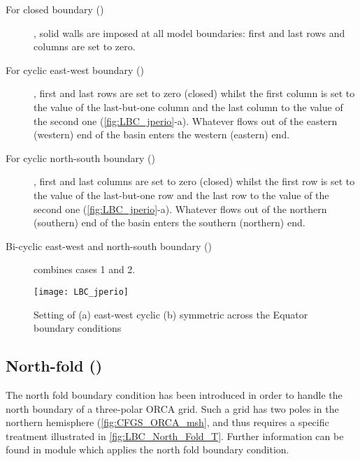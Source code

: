 \documentclass[../main/NEMO_manual]{subfiles}
\begin{document}
\begin{description}

\item [For closed boundary ()], solid walls are imposed at all model boundaries:
  first and last rows and columns are set to zero.

\item [For cyclic east-west boundary ()], first and last rows are set to zero (closed) whilst the first column is set to
  the value of the last-but-one column and the last column to the value of the second one
  (\autoref{fig:LBC_jperio}-a).
  Whatever flows out of the eastern (western) end of the basin enters the western (eastern) end.

\item [For cyclic north-south boundary ()], first and last columns are set to zero (closed) whilst the first row is set to
  the value of the last-but-one row and the last row to the value of the second one
  (\autoref{fig:LBC_jperio}-a).
  Whatever flows out of the northern (southern) end of the basin enters the southern (northern) end.

\item [Bi-cyclic east-west and north-south boundary ()] combines cases 1 and 2.

\end{description}

\begin{figure}[!t]
  \centering
  \texttt{[image: LBC\_jperio]}
  \caption[Setting of east-west cyclic and symmetric across the Equator boundary conditions]{
    Setting of (a) east-west cyclic (b) symmetric across the Equator boundary conditions}
  \label{fig:LBC_jperio}
\end{figure}

\subsection[North-fold (\forcode{=3,6})]{North-fold (\protect{})}
\label{subsec:LBC_north_fold}

The north fold boundary condition has been introduced in order to handle the north boundary of
a three-polar ORCA grid.
Such a grid has two poles in the northern hemisphere (\autoref{fig:CFGS_ORCA_msh},
and thus requires a specific treatment illustrated in \autoref{fig:LBC_North_Fold_T}.
Further information can be found in  module which applies the north fold boundary condition.
\end{document}
